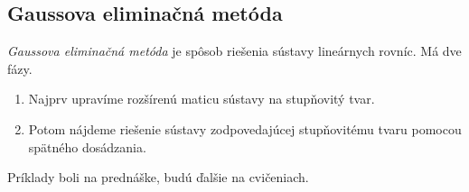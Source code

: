 \subsection{Gaussova eliminačná metóda}

\emph{Gaussova eliminačná metóda} je spôsob riešenia sústavy lineárnych rovníc. Má
dve fázy.
\begin{enumerate}
\item Najprv upravíme rozšírenú maticu sústavy na stupňovitý tvar.
\item Potom nájdeme riešenie sústavy zodpovedajúcej stupňovitému tvaru pomocou
spätného dosádzania.
\end{enumerate}
Príklady boli na prednáške, budú ďalšie na cvičeniach.

